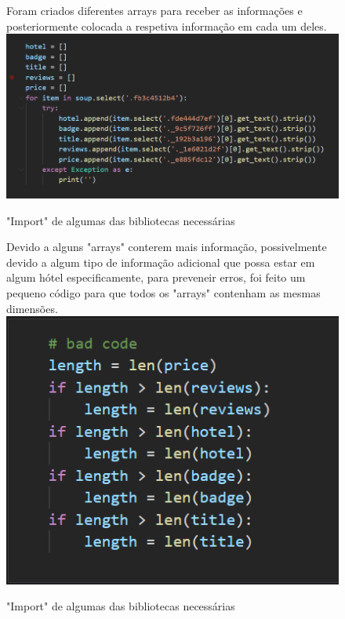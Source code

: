 \documentclass[a4paper,10pt]{article}
\begin{document}
\newpage

\begin{figure}[!htb]
Foram criados diferentes arrays para receber as informações e posteriormente colocada a respetiva informação em cada um deles.
    \centering
    \includegraphics[width=15cm]{4.PNG}
    \caption{"Import" de algumas das bibliotecas necessárias}
    \label{fig:my_label}
\end{figure}

\begin{figure}[!htb]
Devido a alguns "arrays" conterem mais informação, possivelmente devido a algum tipo de informação adicional que possa estar em algum hótel especificamente, para preveneir erros, foi feito um pequeno código para que todos os "arrays" contenham as mesmas dimensões.
    \centering
    \includegraphics[width=15cm]{5.PNG}
    \caption{"Import" de algumas das bibliotecas necessárias}
    \label{fig:my_label}
\end{figure}
\end{document}
